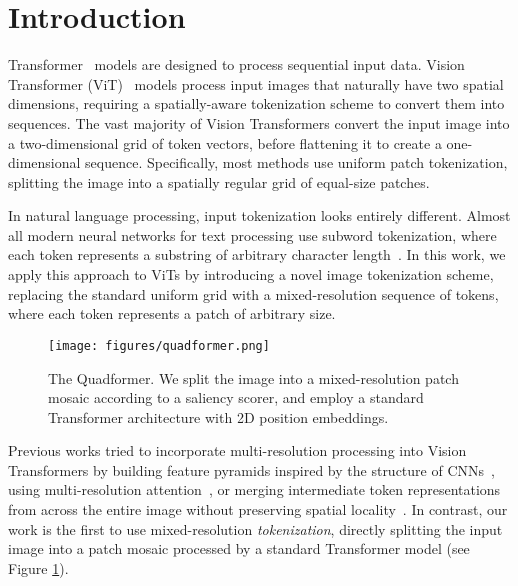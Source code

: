 \section{Introduction}
Transformer~\cite{Vaswani2017AttentionIA} models are designed to process sequential input data. Vision Transformer (ViT)~\cite{Dosovitskiy2020AnII} models process input images that naturally have two spatial dimensions, requiring a spatially-aware tokenization scheme to convert them into sequences. The vast majority of Vision Transformers convert the input image into a two-dimensional grid of token vectors, before flattening it to create a one-dimensional sequence. Specifically, most methods use uniform patch tokenization, splitting the image into a spatially regular grid of equal-size patches.

In natural language processing, input tokenization looks entirely different. Almost all modern neural networks for text processing use subword tokenization, where each token represents a substring of arbitrary character length~\cite{Sennrich2015NeuralMT,Kudo2018SubwordRI}.
In this work, we apply this approach to ViTs by introducing a novel image tokenization scheme, replacing the standard uniform grid with a mixed-resolution sequence of tokens, where each token represents a patch of arbitrary size.



\begin{figure}[t!]
  \centering
  \texttt{[image: figures/quadformer.png]}
  \caption{The Quadformer. We split the image into a mixed-resolution patch mosaic according to a saliency scorer, and employ a standard Transformer architecture with 2D position embeddings.}
  \label{figure:quadformer}
\end{figure}


Previous works tried to incorporate multi-resolution processing into Vision Transformers by building feature pyramids inspired by the structure of CNNs~\cite{Wang2021PyramidVT,Graham2021LeViTAV}, using multi-resolution attention~\cite{Yang2021FocalSF,Tang2022QuadTreeAF}, or merging intermediate token representations from across the entire image without preserving spatial locality~\cite{Renggli2022LearningTM,Bolya2022TokenMY}. In contrast, our work is the first to use mixed-resolution \textit{tokenization}, directly splitting the input image into a patch mosaic processed by a standard Transformer model (see Figure \ref{figure:quadformer}).


